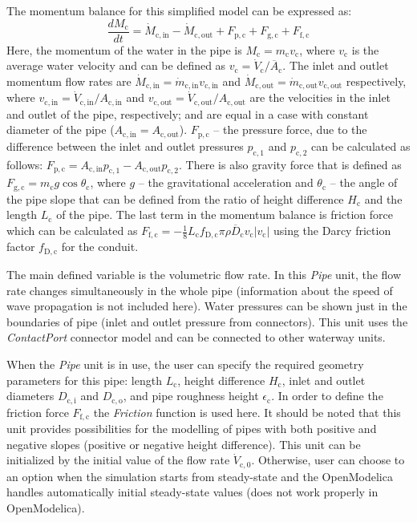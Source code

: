 \documentclass[%
]{USN-PhD}
\begin{document}
The momentum balance for this simplified model can be expressed as:
\begin{equation}\label{eq:eq18}
\frac{dM_\mathrm{c}}{dt} = \dot{M}_\mathrm{c,in} - \dot{M}_\mathrm{c,out} + F_\mathrm{p,c} + F_\mathrm{g,c} + F_\mathrm{f,c}
\end{equation}
Here, the momentum of the water in the pipe is $M_\mathrm{c}=m_\mathrm{c}v_\mathrm{c}$, where $v_\mathrm{c}$ is the average water velocity and can be defined as $v_\mathrm{c}=\dot{V}_\mathrm{c}/\overline{A}_\mathrm{c}$. The inlet and outlet momentum flow rates are $\dot{M}_\mathrm{c,in}=\dot{m}_\mathrm{c,in}v_\mathrm{c,in}$ and $\dot{M}_\mathrm{c,out}=\dot{m}_\mathrm{c,out}v_\mathrm{c,out}$ respectively, where $v_\mathrm{c,in}=\dot{V}_\mathrm{c,in}/A_\mathrm{c,in}$ and $v_\mathrm{c,out}=\dot{V}_\mathrm{c,out}/A_\mathrm{c,out}$ are the velocities in the inlet and outlet of the pipe, respectively; and are equal in a case with constant diameter of the pipe ($A_\mathrm{c,in}=A_\mathrm{c,out}$). $F_\mathrm{p,c}$ -- the pressure force, due to the difference between the inlet and outlet pressures $p_\mathrm{c,1}$ and $p_\mathrm{c,2}$ can be calculated as follows: $F_\mathrm{p,c}=A_\mathrm{c,in}p_\mathrm{c,1}-A_\mathrm{c,out}p_\mathrm{c,2}$. There is also gravity force that is defined as $F_\mathrm{g,c}=m_\mathrm{c}g\cos\theta_\mathrm{c}$, where $g$ -- the gravitational acceleration and $\theta_\mathrm{c}$ -- the angle of the pipe slope that can be defined from the ratio of height difference $H_\mathrm{c}$ and the length $L_\mathrm{c}$ of the pipe. The last term in the momentum balance is friction force which can be calculated as $F_\mathrm{f,c}=-\frac{1}{8}L_\mathrm{c}f_\mathrm{D,c}\pi\rho\overline{D}_\mathrm{c}v_\mathrm{c}|v_\mathrm{c}|$ using the Darcy friction factor $f_\mathrm{D,c}$ for the conduit.

The main defined variable is the volumetric flow rate. In this \emph{Pipe} unit, the flow rate changes simultaneously in the whole pipe (information about the speed of wave propagation is not included here). Water pressures can be shown just in the boundaries of pipe (inlet and outlet pressure from connectors). This unit uses the \emph{ContactPort} connector model and can be connected to other waterway units.

When the \emph{Pipe} unit is in use, the user can specify the required geometry parameters for this pipe: length $L_\mathrm{c}$, height difference $H_\mathrm{c}$, inlet and outlet diameters $D_\mathrm{c,i}$ and $D_\mathrm{c,o}$, and pipe roughness height $\epsilon_\mathrm{c}$. In order to define the friction force $F_\mathrm{f,c}$ the \emph{Friction} function is used here. It should be noted that this unit provides possibilities for the modelling of pipes with both positive and negative slopes (positive or negative height difference). This unit can be initialized by the initial value of the flow rate $\dot{V}_\mathrm{c,0}$. Otherwise, user can choose to an option when the simulation starts from steady-state and the OpenModelica handles automatically initial steady-state values (does not work properly in OpenModelica).
\end{document}
